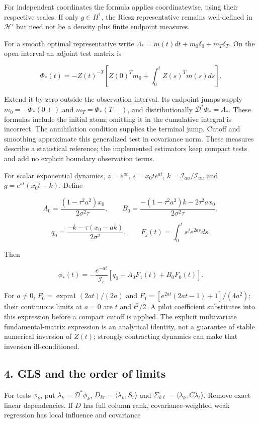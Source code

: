 \documentclass[
  american,
  11pt,
]{article}
\begin{document}
For independent coordinates the formula applies coordinatewise, using
their respective scales. If only \(g\in H^1\), the Riesz representative
remains well-defined in \(\mathcal H'\) but need not be a density plus
finite endpoint measures.

For a smooth optimal representative write
\(\Lambda_*=m(t)dt+m_0\delta_0+m_T\delta_T\). On the open interval an
adjoint test matrix is

\[
\Phi_*(t)=-Z(t)^{-T}
\left[Z(0)^Tm_0+\int_0^t Z(s)^Tm(s)ds\right].
\]

Extend it by zero outside the observation interval. Its endpoint jumps
supply \(m_0=-\Phi_*(0+)\) and \(m_T=\Phi_*(T-)\), and distributionally
\(\mathcal D^*\Phi_*=\Lambda_*\). These formulas include the initial
atom; omitting it in the cumulative integral is incorrect. The
annihilation condition supplies the terminal jump. Cutoff and smoothing
approximate this generalized test in covariance norm. These measures
describe a statistical reference; the implemented estimators keep
compact tests and add no explicit boundary observation terms.

For scalar exponential dynamics, \(z=e^{at}\), \(s=x_0te^{at}\),
\(k=\mathcal I_{au}/\mathcal I_{uu}\) and \(g=e^{at}(x_0t-k)\). Define

\[
A_0=\frac{(1-\tau^2a^2)x_0}{2\sigma^2\tau},\qquad
B_0=\frac{-(1-\tau^2a^2)k-2\tau^2ax_0}{2\sigma^2\tau},
\]

\[
q_0=\frac{-k-\tau(x_0-ak)}{2\sigma^2},\qquad
F_j(t)=\int_0^t s^je^{2as}ds.
\]

Then

\[
\phi_*(t)=-\frac{e^{-at}}{\mathcal I_e}
[q_0+A_0F_1(t)+B_0F_0(t)].
\]

For \(a\ne0\), \(F_0=\operatorname{expm1}(2at)/(2a)\) and
\(F_1=[e^{2at}(2at-1)+1]/(4a^2)\); their continuous limits at \(a=0\)
are \(t\) and \(t^2/2\). A pilot coefficient substitutes into this
expression before a compact cutoff is applied. The explicit multivariate
fundamental-matrix expression is an analytical identity, not a guarantee
of stable numerical inversion of \(Z(t)\); strongly contracting dynamics
can make that inversion ill-conditioned.

\subsection{4. GLS and the order of
limits}\label{gls-and-the-order-of-limits}

For tests \(\phi_k\), put \(\lambda_k=\mathcal D^*\phi_k\),
\(D_{kr}=\langle\lambda_k,S_r\rangle\) and
\(\Sigma_{k\ell}=\langle\lambda_k,C\lambda_\ell\rangle\). Remove exact
linear dependencies. If \(D\) has full column rank, covariance-weighted
weak regression has local influence and covariance
\end{document}
